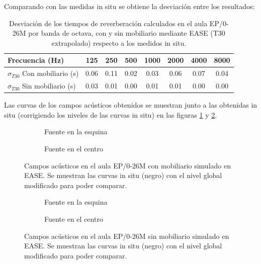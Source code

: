 Comparando con las medidas in situ se obtiene la desviación entre los resultados:

\begin{table}[ht]
\centering
{
\begin{tabular}{@{}lccccccc@{}}
\toprule
Frecuencia (Hz) & 125 & 250 & 500 & 1000 & 2000 & 4000 & 8000 \\ \midrule
$\sigma_{T30}$ Con mobiliario (s) & 0.06 & 0.11 & 0.02 & 0.03 & 0.06 & 0.07 & 0.04 \\
$\sigma_{T30}$ Sin mobiliario (s) & 0.03 & 0.01 & 0.00 & 0.01 & 0.01 & 0.00 & 0.00 \\ \bottomrule
\end{tabular}
}
\caption{Desviación de los tiempos de reverberación calculados en el aula EP/0-26M por banda de octava, con y sin mobiliario mediante EASE (T30 extrapolado) respecto a los medidos in situ.}
\label{tab:desrevepsease}
\end{table}
\FloatBarrier

Las curvas de los campos acústicos obtenidos se muestran junto a las obtenidas in situ (corrigiendo los niveles de las curvas in situ) en las figuras \ref{graf:easeepsmob} y \ref{graf:easeepsnomob}.

\begin{figure}[ht]
    \begin{subfigure}[b]{0.4\textwidth}
    	\centering%
         {%
    }
    \caption{Fuente en la esquina}%
    \end{subfigure}%
    \hspace{1.9cm}%
    \begin{subfigure}[b]{0.4\textwidth}%
    	\centering%
        {%
    }
    \caption{Fuente en el centro}%
    \end{subfigure}
    \caption{Campos acústicos en el aula EP/0-26M con mobiliario simulado en EASE. Se muestran las curvas in situ (negro) con el nivel global modificado para poder comparar.}
    \label{graf:easeepsmob}%
\end{figure}
\FloatBarrier 

\begin{figure}[ht]
    \begin{subfigure}[b]{0.4\textwidth}
    	\centering%
         {%
    }
    \caption{Fuente en la esquina}%
    \end{subfigure}%
    \hspace{1.9cm}%
    \begin{subfigure}[b]{0.4\textwidth}%
    	\centering%
        {%
    }
    \caption{Fuente en el centro}%
    \end{subfigure}
    \caption{Campos acústicos en el aula EP/0-26M sin mobiliario simulado en EASE. Se muestran las curvas in situ (negro) con el nivel global modificado para poder comparar.}
    \label{graf:easeepsnomob}%
\end{figure}
\FloatBarrier 

